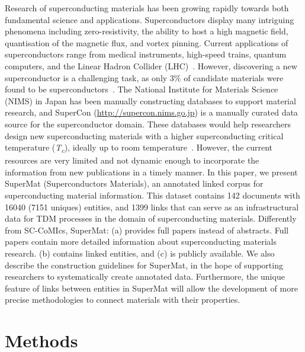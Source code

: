 \documentclass[fleqn,10pt]{wlscirep}
\begin{document}
Research of superconducting materials has been growing rapidly towards both fundamental science and applications. Superconductors display many intriguing phenomena including zero-resistivity, the ability to host a high magnetic field, quantisation of the magnetic flux, and vortex pinning.  
Current applications of superconductors range from medical instruments, high-speed trains, quantum computers, and the Linear Hadron Collider (LHC)~\cite{PhilippeBook, Kizu2010ConstructionOT, Cardani2017NewAO}. 
However, discovering a new superconductor is a challenging task, as only 3\% of candidate materials were found to be superconductors~\cite{Konno2018DeepLO}.
The National Institute for Materials Science (NIMS) in Japan has been manually constructing databases to support material research, and SuperCon (\url{http://supercon.nims.go.jp}) is a manually curated data source for the superconductor domain.
These databases would help researchers design new superconducting materials with a higher superconducting critical temperature (\textit{T\textsubscript{c}}), ideally up to room temperature~\cite{Hamlin2019SuperconductivityNR,stanev2017machine}.
However, the current resources are very limited and not dynamic enough to incorporate the information from new publications in a timely manner. 
In this paper, we present SuperMat (Superconductors Materials), an annotated linked corpus for superconducting material information. 
This dataset contains 142 documents with 16040 (7151 uniques) entities, and 1399 links that can serve as an infrastructural data for TDM processes in the domain of superconducting materials. 
Differently from SC-CoMIcs, SuperMat: (a) provides full papers instead of abstracts. Full papers contain more detailed information about superconducting materials research. (b) contains linked entities, and (c) is publicly available. 
We also describe the construction guidelines for SuperMat, in the hope of supporting researchers to systematically create annotated data.
Furthermore, the unique feature of links between entities in SuperMat will allow the development of more precise methodologies to connect materials with their properties.

\label{sec:method}
\section*{Methods}

\label{content-acquisition}
\end{document}

